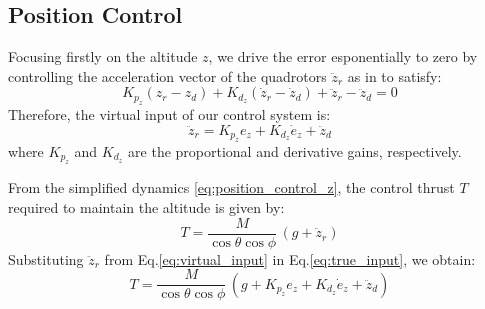 \subsection{Position Control}
Focusing firstly on the altitude $z$,
we drive the error esponentially to zero by controlling the acceleration
vector of the quadrotors $\ddot{z}_r$ as in \cite{simplified_model} to satisfy:
\[
 K_{p_z} ( z_r - z_d )  + K_{d_z} (\dot{z}_r - \dot{z}_d ) + \ddot{z}_r - \ddot{z}_d = 0
\]
\noindent
Therefore, the virtual input of our control system is:
\begin{equation}
    \ddot{z}_r  =  K_{p_z} e_z + K_{d_z} \dot{e}_z + \ddot{z}_d
    \label{eq:virtual_input}
\end{equation}
where \( K_{p_z} \) and \( K_{d_z} \) are the  proportional and derivative gains, respectively.

\noindent
From the simplified dynamics \eqref{eq:position_control_z}, 
the control thrust \( T \) required to maintain the altitude is given by:
\begin{equation}
    T = \frac{M}{\cos\theta \cos\phi} \, (g + \ddot{z}_r)
    \label{eq:true_input}
\end{equation}
\noindent
Substituting \( \ddot{z}_r \) from Eq.\ref{eq:virtual_input} in Eq.\ref{eq:true_input},
we obtain:
\[
T = \frac{M}{\cos\theta \cos\phi} \, \left( g + K_{p_z} e_z + K_{d_z} \dot{e}_z + \ddot{z}_d \right)
\]

